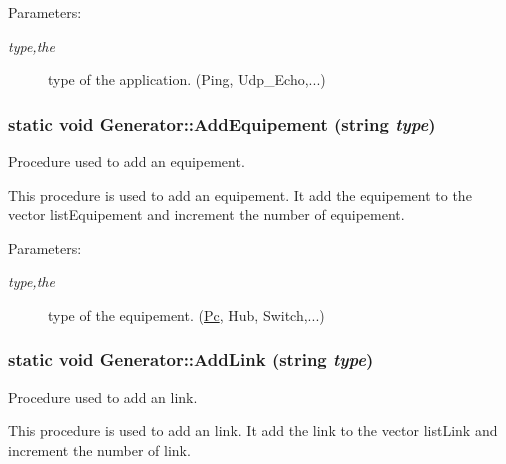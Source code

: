 \begin{Desc}
\item[Parameters:]
\begin{description}
\item[{\em type,the}]type of the application. (Ping, Udp\_\-Echo,...) \end{description}
\end{Desc}
\hypertarget{class_generator_f330b00240a5de589a869d76ef88e12e}{
\subsubsection[{AddEquipement}]{\setlength{\rightskip}{0pt plus 5cm}static void Generator::AddEquipement (string {\em type})}}
\label{class_generator_f330b00240a5de589a869d76ef88e12e}


Procedure used to add an equipement. 

This procedure is used to add an equipement. It add the equipement to the vector listEquipement and increment the number of equipement.

\begin{Desc}
\item[Parameters:]
\begin{description}
\item[{\em type,the}]type of the equipement. (\hyperlink{class_pc}{Pc}, Hub, Switch,...) \end{description}
\end{Desc}
\hypertarget{class_generator_5868a217747ca891ca481d2b085b0839}{
\subsubsection[{AddLink}]{\setlength{\rightskip}{0pt plus 5cm}static void Generator::AddLink (string {\em type})}}
\label{class_generator_5868a217747ca891ca481d2b085b0839}


Procedure used to add an link. 

This procedure is used to add an link. It add the link to the vector listLink and increment the number of link.

